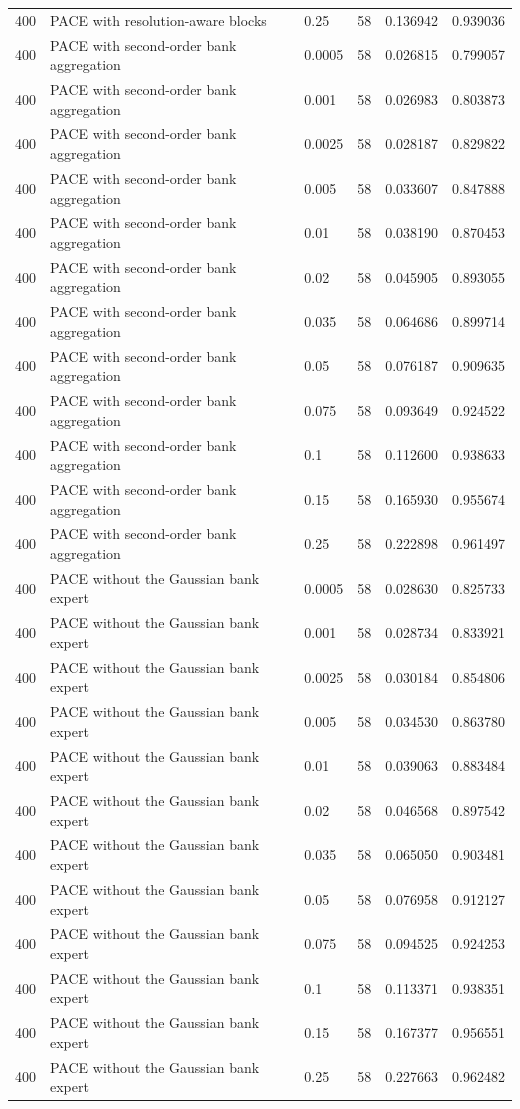 \begin{tabular}{llllll}
400 & PACE with resolution-aware blocks & 0.25 & 58 & 0.136942 & 0.939036 \\
400 & PACE with second-order bank aggregation & 0.0005 & 58 & 0.026815 & 0.799057 \\
400 & PACE with second-order bank aggregation & 0.001 & 58 & 0.026983 & 0.803873 \\
400 & PACE with second-order bank aggregation & 0.0025 & 58 & 0.028187 & 0.829822 \\
400 & PACE with second-order bank aggregation & 0.005 & 58 & 0.033607 & 0.847888 \\
400 & PACE with second-order bank aggregation & 0.01 & 58 & 0.038190 & 0.870453 \\
400 & PACE with second-order bank aggregation & 0.02 & 58 & 0.045905 & 0.893055 \\
400 & PACE with second-order bank aggregation & 0.035 & 58 & 0.064686 & 0.899714 \\
400 & PACE with second-order bank aggregation & 0.05 & 58 & 0.076187 & 0.909635 \\
400 & PACE with second-order bank aggregation & 0.075 & 58 & 0.093649 & 0.924522 \\
400 & PACE with second-order bank aggregation & 0.1 & 58 & 0.112600 & 0.938633 \\
400 & PACE with second-order bank aggregation & 0.15 & 58 & 0.165930 & 0.955674 \\
400 & PACE with second-order bank aggregation & 0.25 & 58 & 0.222898 & 0.961497 \\
400 & PACE without the Gaussian bank expert & 0.0005 & 58 & 0.028630 & 0.825733 \\
400 & PACE without the Gaussian bank expert & 0.001 & 58 & 0.028734 & 0.833921 \\
400 & PACE without the Gaussian bank expert & 0.0025 & 58 & 0.030184 & 0.854806 \\
400 & PACE without the Gaussian bank expert & 0.005 & 58 & 0.034530 & 0.863780 \\
400 & PACE without the Gaussian bank expert & 0.01 & 58 & 0.039063 & 0.883484 \\
400 & PACE without the Gaussian bank expert & 0.02 & 58 & 0.046568 & 0.897542 \\
400 & PACE without the Gaussian bank expert & 0.035 & 58 & 0.065050 & 0.903481 \\
400 & PACE without the Gaussian bank expert & 0.05 & 58 & 0.076958 & 0.912127 \\
400 & PACE without the Gaussian bank expert & 0.075 & 58 & 0.094525 & 0.924253 \\
400 & PACE without the Gaussian bank expert & 0.1 & 58 & 0.113371 & 0.938351 \\
400 & PACE without the Gaussian bank expert & 0.15 & 58 & 0.167377 & 0.956551 \\
400 & PACE without the Gaussian bank expert & 0.25 & 58 & 0.227663 & 0.962482 \\
\bottomrule
\end{tabular}
